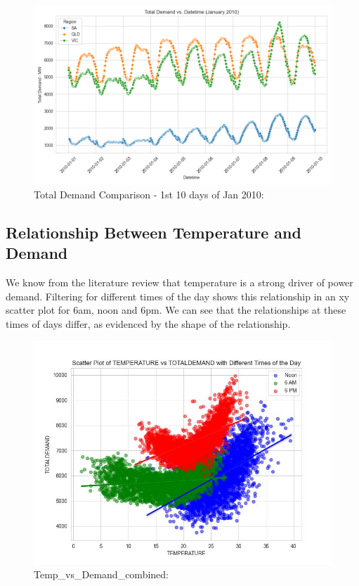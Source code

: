 \documentclass[mstat,12pt]{unswthesis}
\begin{document}
\begin{figure}
\centering
\includegraphics{img/TotalDemand_Jan2010.png}
\caption{Total Demand Comparison - 1st 10 days of Jan 2010:}
\end{figure}

\subsection{Relationship Between Temperature and
Demand}\label{relationship-between-temperature-and-demand}

We know from the literature review that temperature is a strong driver
of power demand. Filtering for different times of the day shows this
relationship in an xy scatter plot for 6am, noon and 6pm. We can see
that the relationships at these times of days differ, as evidenced by
the shape of the relationship.

\begin{figure}
\centering
\includegraphics{img/Temp_vs_Demand_combined.jpg}
\caption{Temp\_vs\_Demand\_combined:}
\end{figure}
\end{document}
